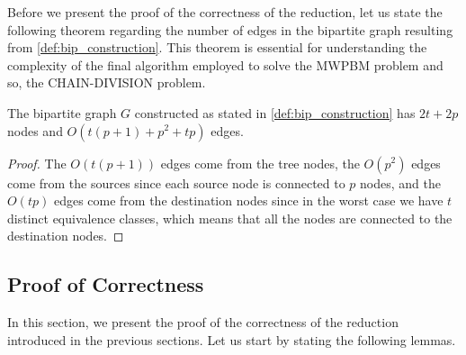 Before we present the proof of the correctness of the reduction, let us state the following theorem regarding the number of edges in the bipartite graph resulting from \cref{def:bip_construction}. This theorem is essential for understanding the complexity of the final algorithm employed to solve the \textsc{MWPBM} problem and so, the \textsc{CHAIN-DIVISION} problem.

\begin{theorem}
    The bipartite graph $G$ constructed as stated in \cref{def:bip_construction} has $2t + 2p$ nodes and $O(t (p + 1) + p^2 + tp)$ edges.
\end{theorem}

\begin{proof}
    The $O(t (p + 1))$ edges come from the tree nodes, the $O(p^2)$ edges come from the sources since each source node is connected to $p$ nodes, and the $O(tp)$ edges come from the destination nodes since in the worst case we have $t$ distinct equivalence classes, which means that all the nodes are connected to the destination nodes. 
\end{proof}

\subsection{Proof of Correctness}
In this section, we present the proof of the correctness of the reduction introduced in the previous sections. Let us start by stating the following lemmas.

\begin{comment}
\begin{lemma} \label{lemma:all_destinations}
    Exactly $|\equivset|$ nodes of the set $\treeset{1}$ are connected to all the destination nodes $d_i \in \destset$ with weight $0$.
\end{lemma}

\begin{proof}
    As outlined in \cref{def:bip_construction}, the destination nodes $d_i \in V_2$ are connected to nodes $u_i \in \treeset{1}$ with weight $0$ iff for all $v_j \in \treeset{2}$ such that $j > i$, $\equivsetfunc{v_j} \neq \equivsetfunc{u_i}$, i.e. $u_i$ is the last of its class in the ordering. Consequently, there are exactly $|\equivset|$ nodes in $\treeset{1}$ that are last representatives of their class in the ordering.
\end{proof}
\end{comment}

